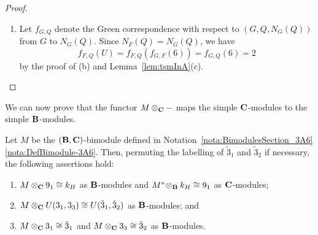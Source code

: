 \begin{proof}
\begin{enumerate}[label={\rm(\alph*)}]
    Let $f_{G,F}$ denote the Green correspondence with respect to $(G,P,F)$ from $G$ to $F$. 
    The proof of (a) shows that $f_{G,F}(15)=9_1$, thus, as the Green correspondence and the Brauer correspondence commute, $f_{G,F}(6)$  belongs to $\bC$ as well. It is a trivial source module with vertex $Q$ and, by definition, it is a direct summand of the  $2$-permutation module $W':=\Res^{G}_{F}(6)$\,. Moreover, $\chi^{}_{\widehat{f_{G,F}(6)}}$ is a sum of constituents of $\chi^{}_{\widehat{W'}}=\Res^{G}_{F}(\chi^{}_{\widehat{6}})$
    and by~\cite[II, Lemma 12.6(ii)]{LandrockBook} $\chi^{}_{\widehat{f_{G,F}(6)}}$ takes non-negative integer values at all $2$-elements. Therefore, it follows from Notation~\ref{nota:Section_3A6}\ref{nota:3A6-decompMatrixA} that the only possibility is 
    \[
        \Res^{G}_{F}(\chi^{}_{\widehat{6}})=\chi^{}_{\widehat{f_{G,F}(6)}}=\chi^{}_{16}\,.
    \]
    We then read from the decomposition matrix of $\bC$ that $f_{G,F}(6)$ is uniserial of length $2$ with composition factors $3_1$ and $3_3$. The claim follows. 
    \item  Let $f_{G,Q}$ denote the Green correspondence with respect to $(G,Q,N_{G}(Q))$ from $G$ to $N_G(Q)$. 
    Since $N_F(Q)=N_G(Q)$, we have  
    \[
    f_{F,Q}(U)=f_{F,Q}(f_{G,F}(6))=f_{G,Q}(6)=2
    \]
    by the proof of (b) and Lemma~\ref{lem:tsmInA}(c).
\end{enumerate} 
\end{proof}


\noindent We can now prove that
the functor $M\otimes_{{\mathbf{C}}}-$ maps 
the simple $\bC$-modules to the simple \medskip ${\mathbf{B}}$-modules.


\begin{lem}\label{lem:simple-tensor-M-3A6}%
Let $M$ be the $({\mathbf{B}},{\mathbf{C}})$-bimodule defined in Notation~\ref{nota:BimodulesSection_3A6}{\rm\ref{nota:DefBimodule-3A6}}. 
Then, permuting the labelling of $\tilde{3}_1$ and $\tilde{3}_2$ if necessary, the following assertions hold:
\begin{enumerate}[label={\rm(\alph*)}]
    \item $M\otimes_{{\mathbf{C}}}9_1\cong k_H$ as ${\mathbf{B}}$-modules and  $M^\ast\!\otimes_{{\mathbf{B}}}k_H\cong 9_1$ as $\bC$-modules;
    \item $M\otimes_{{\mathbf{C}}}U(3_1,3_3)\cong U(\tilde{3}_1,\tilde{3}_2)$ as ${\mathbf{B}}$-modules; and 
    \item $M\otimes_{{\mathbf{C}}}3_1\cong \tilde{3}_1$ and $M\otimes_{{\mathbf{C}}}3_3\cong \tilde{3}_2$  as ${\mathbf{B}}$-modules.  
\end{enumerate}
\end{lem}


